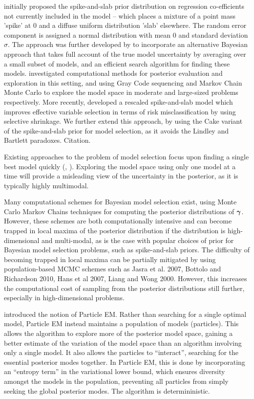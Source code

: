 \documentclass{amsart}[12pt]
\begin{document}
\cite{Mitchell1988} initially proposed the spike-and-slab prior distribution on regression co-efficients not
currently included in the model -- which places a mixture of a point mass 'spike' at $0$ and a diffuse uniform
distribution 'slab' elsewhere. The random error component is assigned a normal distribution with mean $0$ and
standard deviation $\sigma$. The approach was further developed by \cite{Madigan1994} to incorporate an
alternative Bayesian approach that takes full account of the true model uncertainty by averaging over a small
subset of models, and an efficient search algorithm for finding these models. \cite{George1997} investigated
computational methods for posterior evaluation and exploration in this setting, and using Gray Code sequencing
and Markov Chain Monte Carlo to explore the model space in moderate and large-sized problems respectively.
More recently, \cite{Ishwaran2005} developed a rescaled spike-and-slab model which improves effective variable
selection in terms of risk misclassification by using selective shrinkage. We further extend this approach, by
using the Cake variant of the spike-and-slab prior for model selection, as it avoids the Lindley and Bartlett
paradoxes. Citation.

Existing approaches to the problem of model selection focus upon finding a single best model quickly
(\cite{You2014}, \cite{Rockova2014}). Exploring the model space using only one model at a time will provide a
misleading view of the uncertainty in the posterior, as it is typically highly multimodal.

Many computational schemes for Bayesian model selection exist, using Monte Carlo Markov Chains techniques for 
computing the posterior distributions of ${\boldsymbol \gamma}$.
However, these schemes are both computationally intensive and can become trapped in local maxima of
the posterior distribution if the distribution is high-dimensional and multi-modal, as is the case with
popular choices of prior for Bayesian model selection problems, such as spike-and-slab priors. The difficulty
of becoming trapped in local maxima can be partially mitigated by using population-based MCMC schemes such
as Jasra et al. 2007, Bottolo and Richardson 2010, Hans et al 2007, Liang and Wong 2000. However, this
increases the computational cost of sampling from the posterior distributions still further, especially in
high-dimensional problems.

\cite{Rockova2016} introduced the notion of Particle EM. Rather than searching for a single optimal model,
Particle EM instead maintains a population of models (particles). This allows the algorithm to explore more of
the posterior model space, gaining a better estimate of the variation of the model space than an algorithm
involving only a single model. It also allows the particles to ``interact'', searching for the essential
posterior modes together. In Particle EM, this is done by incorporating an ``entropy term'' in the variational
lower bound, which ensures diversity amongst the models in the population, preventing all particles from
simply seeking the global posterior modes. The algorithm is determininistic.
\end{document}
